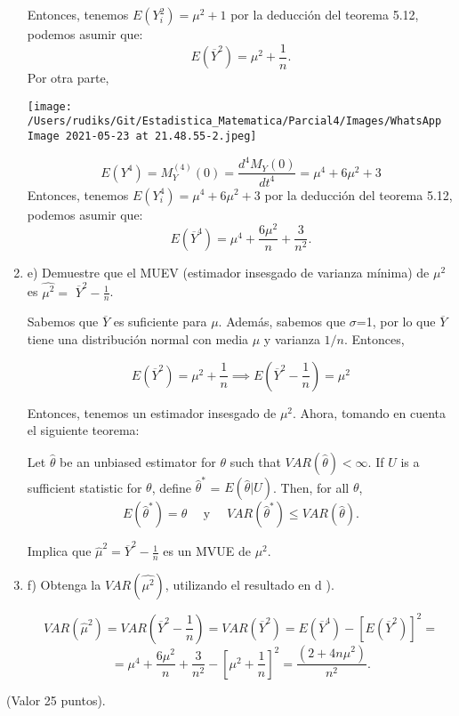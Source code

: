 \begin{enumerate}
\begin{solution}
		Entonces, tenemos $E(Y^2_i)=\mu^2+1$ por la deducción del teorema 5.12, podemos asumir que: 
		$$E(\overline{Y}^2)=\mu^2+\frac{1}{n}.$$
		Por otra parte,
		\begin{center}
			\texttt{[image: /Users/rudiks/Git/Estadistica\_Matematica/Parcial4/Images/WhatsApp Image 2021-05-23 at 21.48.55-2.jpeg]}
		\end{center}
		$$E(Y^4)=M^{(4)}_Y(0)=\frac{d^4M_Y(0)}{dt^4}=\mu^4+6\mu^2+3$$
		Entonces, tenemos $E(Y^4_i)=\mu^4+6\mu^2+3$ por la deducción del teorema 5.12, podemos asumir que: 
		$$E(\overline{Y}^4)=\mu^4+\frac{6\mu^2}{n}+\frac{3}{n^2}.$$
	\end{solution}
    \item e) Demuestre que el MUEV (estimador insesgado de varianza mínima) de $\mu^{2}$ es $\widehat{\mu^{2}}=$ $\overline{Y}^{2}-\frac{1}{n}$. \begin{solution}
    	Sabemos que $\overline{Y}$ es suficiente para $\mu$. Además, sabemos que $\sigma$=1, por lo que $\overline{Y}$ tiene una distribución normal con media $\mu$ y varianza $1/n$.  Entonces,
    	
    	$$E(\overline{Y}^2)=\mu^2 +\frac{1}{n}\implies E\left(\overline{Y}^2-\frac{1}{n}\right)=\mu^2$$  
    	
    	
    	 Entonces, tenemos un estimador insesgado de $\mu^2$. Ahora, tomando en cuenta el siguiente teorema:	\begin{tcolorbox}[colback=gray!15,colframe=black!1!black,title=The Rao–Blackwell Theorem]
    		Let $\hat{\theta}$ be an unbiased estimator for $\theta$ such that
    		$VAR(\hat{\theta}) < \infty$. If $U$ is a sufficient statistic for $\theta$, define $\hat{\theta}^*$ = $E(\hat{\theta} |U)$. Then, for
    		all $\theta$,
    		$$E(\hat{\theta}^*)=\theta \quad \text{ y } \quad VAR(\hat{\theta}^*)\leq VAR(\hat{\theta}).$$
    		\end{tcolorbox}
    	Implica que $\hat{\mu}^2=\overline{Y}^2-\frac{1}{n}$ es un MVUE de $\mu^2$. 
    \end{solution}
	\item f) Obtenga la $V A R\left(\widehat{\mu^{2}}\right)$, utilizando el resultado en $\mathrm{d}$ ).
	\begin{solution}
		$$VAR(\hat{\mu}^2)=VAR\left(\overline{Y}^2-\frac{1}{n}\right)=VAR\left(\overline{Y}^2\right)=E(\overline{Y}^4)-[E(\overline{Y}^2)]^2=$$
		$$=\mu^4+\frac{6\mu^2}{n}+\frac{3}{n^2}-\left[\mu^2+\frac{1}{n}\right]^2=\frac{\left(2+4n\mu^2\right)}{n^2}.$$
	\end{solution} 
\end{enumerate}
(Valor 25 puntos).

